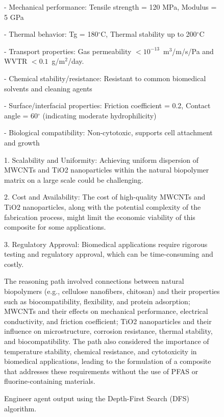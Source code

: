 \begin{figure}[htbp]
\begin{mdframed}
    - Mechanical performance: Tensile strength = 120 MPa, Modulus = 5 GPa
    
    - Thermal behavior: Tg = 180$^{\circ}$C, Thermal stability up to 200$^{\circ}$C
    
    - Transport properties: Gas permeability $< 10^{-13}$~m$^3$/m/s/Pa and WVTR $< 0.1$~g/m$^2$/day.
    
    - Chemical stability/resistance: Resistant to common biomedical solvents and cleaning agents
    
    - Surface/interfacial properties: Friction coefficient = 0.2, Contact angle = 60$^{\circ}$ (indicating moderate hydrophilicity)
    
    - Biological compatibility: Non-cytotoxic, supports cell attachment and growth

    
    \textbf{}
    
    1. Scalability and Uniformity: Achieving uniform dispersion of MWCNTs and TiO2 nanoparticles within the natural biopolymer matrix on a large scale could be challenging.
    
    2. Cost and Availability: The cost of high-quality MWCNTs and TiO2 nanoparticles, along with the potential complexity of the fabrication process, might limit the economic viability of this composite for some applications. 
    
    3. Regulatory Approval: Biomedical applications require rigorous testing and regulatory approval, which can be time-consuming and costly.
    
    \textbf{}
    
    The reasoning path involved connections between natural biopolymers (e.g., cellulose nanofibers, chitosan) and their properties such as biocompatibility, flexibility, and protein adsorption; MWCNTs and their effects on mechanical performance, electrical conductivity, and friction coefficient; TiO2 nanoparticles and their influence on microstructure, corrosion resistance, thermal stability, and biocompatibility. The path also considered the importance of temperature stability, chemical resistance, and cytotoxicity in biomedical applications, leading to the formulation of a composite that addresses these requirements without the use of PFAS or fluorine-containing materials.
    
  \end{mdframed}
  \caption{Engineer agent output using the Depth-First Search (DFS) algorithm.}
  \label{fig:engineer_DFS}
\end{figure}

